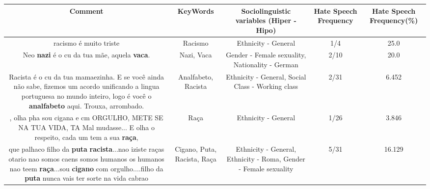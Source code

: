 \documentclass[11pt]{article}
\newlength\mylength
\begin{document}
\begin{center}
\setlength\mylength{\dimexpr\textwidth - 1\arrayrulewidth - 50\tabcolsep}
\begin{longtable}{|C{.65\mylength}|C{.30\mylength}|C{.12\mylength}|C{.12\mylength}|C{.12\mylength}|}
\hline
\textbf{Comment} & \textbf{KeyWords} & \textbf{Sociolinguistic variables (Hiper - Hipo)}  & \textbf{Hate Speech Frequency} & \textbf{Hate Speech Frequency(\%)} \\
\hline{}\small racismo é muito triste\normalsize   & Racismo & Ethnicity - General & 1/4 & 25.0 \\  \hline
  \small Neo \textbf{nazi} é o cu da tua mãe, aquela \textbf{vaca}.\normalsize   & Nazi, Vaca & Gender - Female sexuality, Nationality - German & 2/10 & 20.0 \\  \hline
  \small Racista é o cu da tua mamaezinha. E se você ainda não sabe, fizemos um acordo unificando a lingua portuguesa no mundo inteiro, logo é você o \textbf{analfabeto} aqui. Trouxa, arrombado.\normalsize   & Analfabeto, Racista & Ethnicity - General, Social Class - Working class & 2/31 & 6.452 \\  \hline
  \small , olha pha sou cigana e cm ORGULHO, METE SE NA TUA VIDA, TA Mal mudasse... E olha o respeito, cada um tem a sua \textbf{raça},\normalsize   & Raça & Ethnicity - General & 1/26 & 3.846 \\  \hline
  \small que palhaco filho da \textbf{puta} \textbf{racista}...nao iziste raças otario nao somos caens somos humanos os humanos nao teem \textbf{raça}...sou \textbf{cigano} com orgulho....filho da \textbf{puta} nunca vais ter sorte na vida cabrao\normalsize   & Cigano, Puta, Racista, Raça & Ethnicity - General, Ethnicity - Roma, Gender - Female sexuality & 5/31 & 16.129 \\  \hline
  
\end{longtable}
\end{center}
\end{document}

